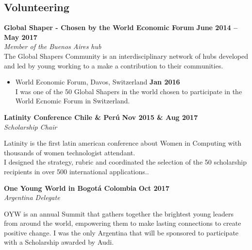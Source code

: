 \documentclass[margin,line]{resume}
\begin{document}
\begin{resume}
\section{\mysidestyle Volunteering}



\textbf{Global Shaper - Chosen by the World Economic Forum} \hfill \textbf{June 2014 -- May 2017} \vspace{2mm}\\\vspace{1mm}
\textsl{Member of the Buenos Aires hub} \\
The Global Shapers Community is an interdisciplinary network of hubs developed and led by young working to a make a contribution to their communities.

\begin{itemize}
\item  World Economic Forum, Davos, Switzerland \hfill \textbf{Jan 2016} \vspace{2mm} \\
I was one of the 50 Global Shapers in the world chosen to participate in the World Ecnomic Forum in Switzerland.
\end{itemize}

\textbf{Latinity Conference Chile \& Per\'u } \hfill 
 \hfill \textbf{Nov 2015 \& Aug 2017} \vspace{2mm}\\\vspace{1mm}
 \textsl{Scholarship Chair } 

Latinity is the first latin american conference about Women in Computing with thousands of women technologist attendant.\\
I designed the strategy, rubric and coordinated the selection of the 50 scholarship recipients in over 500 international applications..

\textbf{ One Young World in Bogot\'a Colombia} \hfill 
 \hfill \textbf{Oct 2017} \vspace{2mm}\\\vspace{1mm}
\textsl{Argentina Delegate } 

OYW is an annual Summit that gathers together the brightest young leaders from around the world, empowering them to make lasting connections to create positive change.  I was the only Argentina that will be sponsored to participate with a Scholarship awarded by Audi.
\newpage


\end{resume}
\end{document}

